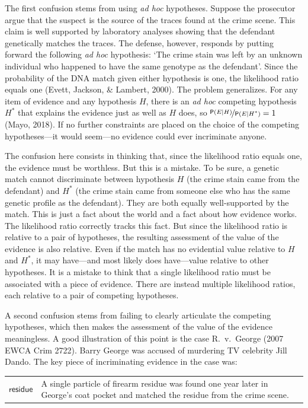 \documentclass[
  10pt,
  dvipsnames,enabledeprecatedfontcommands]{scrartcl}
\newcommand{\pr}[1]{\mathsf{P}(#1)}
\begin{document}
The first confusion stems from using \textit{ad hoc} hypotheses. Suppose
the prosecutor argue that the suspect is the source of the traces found
at the crime scene. This claim is well supported by laboratory analyses
showing that the defendant genetically matches the traces. The defense,
however, responds by putting forward the following \textit{ad hoc}
hypothesis: `The crime stain was left by an unknown individual who
happened to have the same genotype as the defendant'. Since the
probability of the DNA match given either hypothesis is one, the
likelihood ratio equals one (Evett, Jackson, \& Lambert, 2000). The
problem generalizes. For any item of evidence and any hypothesis \(H\),
there is an \textit{ad hoc} competing hypothesis \(H^*\) that explains
the evidence just as well as \(H\) does, so
\(\nicefrac{\pr{E \vert H}}{\pr{E \vert H^*}}=1\) (Mayo, 2018). If no
further constraints are placed on the choice of the competing
hypotheses---it would seem---no evidence could ever incriminate anyone.

The confusion here consists in thinking that, since the likelihood ratio
equals one, the evidence must be worthless. But this is a mistake. To be
sure, a genetic match cannot discriminate between hypothesis \(H\) (the
crime stain came from the defendant) and \(H^*\) (the crime stain came
from someone else who has the same genetic profile as the defendant).
They are both equally well-supported by the match. This is just a fact
about the world and a fact about how evidence works. The likelihood
ratio correctly tracks this fact. But since the likelihood ratio is
relative to a pair of hypotheses, the resulting assessment of the value
of the evidence is also relative. Even if the match has no evidential
value relative to \(H\) and \(H^*\), it may have---and most likely does
have---value relative to other hypotheses. It is a mistake to think that
a single likelihood ratio must be associated with a piece of evidence.
There are instead multiple likelihood ratios, each relative to a pair of
competing hypotheses.

A second confusion stems from failing to clearly articulate the
competing hypotheses, which then makes the assessment of the value of
the evidence meaningless. A good illustration of this point is the case
R.~v.~George (2007 EWCA Crim 2722). Barry George was accused of
murdering TV celebrity Jill Dando. The key piece of incriminating
evidence in the case was:

\begin{center}
\begin{tabular}{lp{12cm}} 
    $\textsf{residue}$ &  
    A single particle of firearm  residue was found one year later in George's coat pocket and matched the residue from the crime scene. 
\end{tabular}
\end{center}
\end{document}
